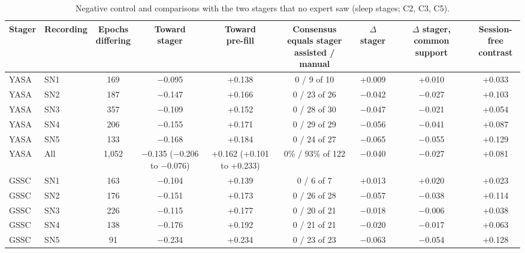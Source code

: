 \begin{table}[h!]
\centering
\scriptsize
\caption{Negative control and comparisons with the two stagers that no expert saw (sleep stages; C2, C3, C5).}
\label{tab:s-stagers}
\begin{adjustbox}{max width=\linewidth}
\begin{tabular}{llccccccc}
\toprule
Stager & Recording & \makecell{Epochs\\differing} & \makecell{Toward\\stager} & \makecell{Toward\\pre-fill} & \makecell{Consensus equals stager\\assisted / manual} & $\Delta$ stager & \makecell{$\Delta$ stager,\\common support} & \makecell{Session-free\\contrast} \\
\midrule
YASA & SN1 & 169 & \ensuremath{-}0.095 & +0.138 & 0 / 9 of 10 & +0.009 & +0.010 & +0.033 \\
YASA & SN2 & 187 & \ensuremath{-}0.147 & +0.166 & 0 / 23 of 26 & \ensuremath{-}0.042 & \ensuremath{-}0.027 & +0.103 \\
YASA & SN3 & 357 & \ensuremath{-}0.109 & +0.152 & 0 / 28 of 30 & \ensuremath{-}0.047 & \ensuremath{-}0.021 & +0.054 \\
YASA & SN4 & 206 & \ensuremath{-}0.155 & +0.171 & 0 / 29 of 29 & \ensuremath{-}0.056 & \ensuremath{-}0.041 & +0.087 \\
YASA & SN5 & 133 & \ensuremath{-}0.168 & +0.184 & 0 / 24 of 27 & \ensuremath{-}0.065 & \ensuremath{-}0.055 & +0.129 \\
YASA & All & 1{,}052 & \ensuremath{-}0.135 (\ensuremath{-}0.206 to \ensuremath{-}0.076) & +0.162 (+0.101 to +0.233) & 0\% / 93\% of 122 & \ensuremath{-}0.040 & \ensuremath{-}0.027 & +0.081 \\
GSSC & SN1 & 163 & \ensuremath{-}0.104 & +0.139 & 0 / 6 of 7 & +0.013 & +0.020 & +0.023 \\
GSSC & SN2 & 176 & \ensuremath{-}0.151 & +0.173 & 0 / 26 of 28 & \ensuremath{-}0.057 & \ensuremath{-}0.038 & +0.114 \\
GSSC & SN3 & 226 & \ensuremath{-}0.115 & +0.177 & 0 / 20 of 21 & \ensuremath{-}0.018 & \ensuremath{-}0.006 & +0.038 \\
GSSC & SN4 & 138 & \ensuremath{-}0.176 & +0.192 & 0 / 21 of 21 & \ensuremath{-}0.020 & \ensuremath{-}0.017 & +0.063 \\
GSSC & SN5 & 91 & \ensuremath{-}0.234 & +0.234 & 0 / 23 of 23 & \ensuremath{-}0.063 & \ensuremath{-}0.054 & +0.128 \\

\end{tabular}
\end{adjustbox}
\end{table}
